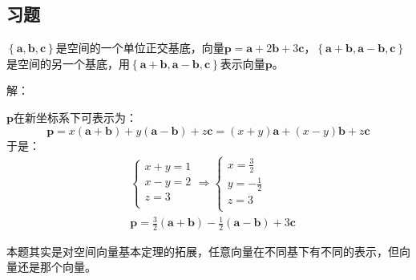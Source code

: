 \subsection{习题}

\begin{example}
$\left\{ \boldsymbol{a},\boldsymbol{b},\boldsymbol{c} \right\} $是空间的一个单位正交基底，向量$\boldsymbol{p}=\boldsymbol{a}+2\boldsymbol{b}+3\boldsymbol{c}$，$\left\{ \boldsymbol{a}+\boldsymbol{b},\boldsymbol{a}-\boldsymbol{b},\boldsymbol{c} \right\} $是空间的另一个基底，用$\left\{ \boldsymbol{a}+\boldsymbol{b},\boldsymbol{a}-\boldsymbol{b},\boldsymbol{c} \right\} $表示向量$\boldsymbol{p}$。
\end{example}

解：

$\boldsymbol{p}$在新坐标系下可表示为：
\[
\boldsymbol{p}=x\left( \boldsymbol{a}+\boldsymbol{b} \right) +y\left( \boldsymbol{a}-\boldsymbol{b} \right) +z\boldsymbol{c}=\left( x+y \right) \boldsymbol{a}+\left( x-y \right) \boldsymbol{b}+z\boldsymbol{c}
\]
于是：
\begin{align*}
&\begin{cases}
	x+y=1\\
	x-y=2\\
	z=3\\
\end{cases}\Rightarrow \begin{cases}
	x=\frac{3}{2}\\
	y=-\frac{1}{2}\\
	z=3\\
\end{cases} \\
&\boldsymbol{p}=\frac{3}{2}\left( \boldsymbol{a}+\boldsymbol{b} \right) -\frac{1}{2}\left( \boldsymbol{a}-\boldsymbol{b} \right) +3\boldsymbol{c}
\end{align*}

\begin{tcolorbox}
本题其实是对空间向量基本定理的拓展，任意向量在不同基下有不同的表示，但向量还是那个向量。
\end{tcolorbox}




